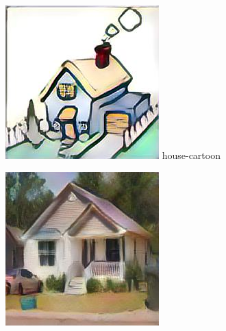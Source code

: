 \documentclass{article}
\begin{document}
\begin{figure}[htp]
    \begin{minipage}{0.14285714285714285\linewidth}
        \includegraphics[width=\linewidth]{./classify/derived-files/house_cartoon_0.jpg}
        {house-cartoon}
    \end{minipage}%
    \begin{minipage}{0.14285714285714285\linewidth}
        \includegraphics[width=\linewidth]{./classify/derived-files/house_photo_0.jpg}

\end{minipage}
\end{figure}
\end{document}
